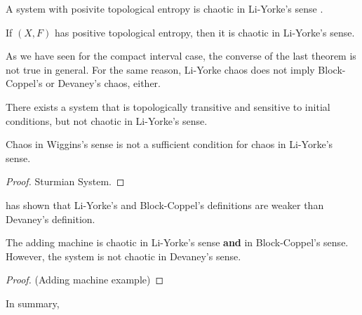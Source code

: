 \documentclass[12pt,twoside,draft]{book}
\begin{document}
A system with posivite topological entropy is chaotic in Li-Yorke's sense .
\begin{theorem}
  \citep{blanchard}
  If $(X,F)$ has positive topological entropy, then it is chaotic in Li-Yorke's sense.
  \label{thm:entropy-liyorke}
\end{theorem}

As we have seen for the compact interval case, the converse of the last theorem is not true in general.
For the same reason, Li-Yorke chaos does not imply Block-Coppel's or Devaney's chaos, either.

There exists a system that is topologically transitive and sensitive to initial conditions, but not chaotic in Li-Yorke's sense.
\begin{theorem}
  \citep{blanchard}
  Chaos in Wiggins's sense is not a sufficient condition for chaos in Li-Yorke's sense.  
  \begin{proof}
    Sturmian System.
  \end{proof}
\end{theorem}

\citet{aulbach} has shown that Li-Yorke's and Block-Coppel's definitions are weaker than Devaney's definition.
\begin{theorem}
  \citep{aulbach} 
  The adding machine is chaotic in Li-Yorke's sense \textbf{and} in Block-Coppel's sense.
  However, the system is not chaotic in Devaney's sense.
  \begin{proof}
    (Adding machine example)
  \end{proof}
\end{theorem}

In summary,




\printindex
\end{document}
